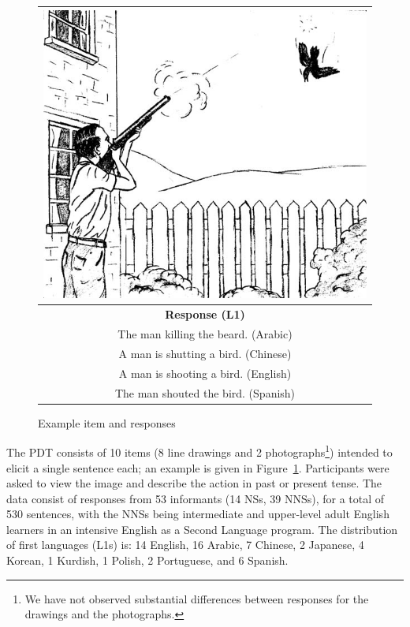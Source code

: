 \documentclass[11pt,letterpaper]{article}
\begin{document}
\begin{figure}
\begin{center}
\begin{tabular}{|c|}
\hline
\includegraphics[width=0.95\columnwidth]{figures/exampleprompt2.jpg}\\
\hline
\textbf{Response (L1)} \\
\hline
The man killing the beard. (Arabic)\\
\hline
A man is shutting a bird. (Chinese) \\
\hline
A man is shooting a bird. (English) \\
\hline
The man shouted the bird. (Spanish)\\
\hline
\end{tabular}
\end{center}
\caption{Example item and responses}
\label{fig:example-picture}
\end{figure}

The PDT consists of 10 items (8 line drawings and 2 photographs\footnote{We have not observed substantial differences between responses for the drawings and the photographs.}) intended to elicit a single sentence
each; an example is given in Figure~\ref{fig:example-picture}. Participants
were asked to view the image and describe the action in past or present tense.
%
The data consist of responses from 53 informants (14 NSs, 39 NNSs),
for a total of 530 sentences, with the NNSs being intermediate and
upper-level adult English learners in an intensive English as a Second
Language program.  The distribution of first languages (L1s) is: 14
English, 16 Arabic, 7 Chinese, 2 Japanese, 4 Korean, 1 Kurdish, 1
Polish, 2 Portuguese, and 6 Spanish.
\end{document}

